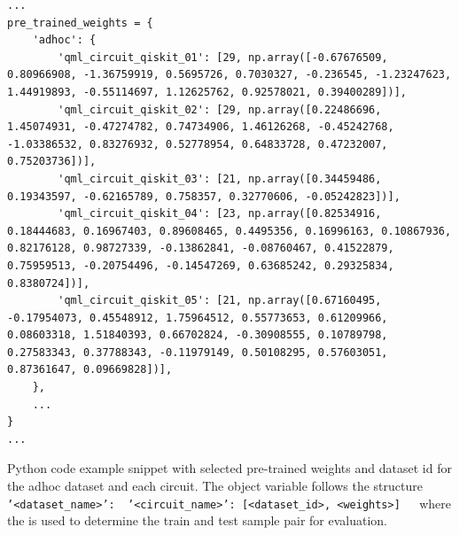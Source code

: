 \begin{listing}[!ht]
    \begin{verbatim}
...
pre_trained_weights = {
    'adhoc': {
        'qml_circuit_qiskit_01': [29, np.array([-0.67676509, 0.80966908, -1.36759919, 0.5695726, 0.7030327, -0.236545, -1.23247623, 1.44919893, -0.55114697, 1.12625762, 0.92578021, 0.39400289])],
        'qml_circuit_qiskit_02': [29, np.array([0.22486696, 1.45074931, -0.47274782, 0.74734906, 1.46126268, -0.45242768, -1.03386532, 0.83276932, 0.52778954, 0.64833728, 0.47232007, 0.75203736])],
        'qml_circuit_qiskit_03': [21, np.array([0.34459486, 0.19343597, -0.62165789, 0.758357, 0.32770606, -0.05242823])],
        'qml_circuit_qiskit_04': [23, np.array([0.82534916, 0.18444683, 0.16967403, 0.89608465, 0.4495356, 0.16996163, 0.10867936, 0.82176128, 0.98727339, -0.13862841, -0.08760467, 0.41522879, 0.75959513, -0.20754496, -0.14547269, 0.63685242, 0.29325834, 0.8380724])],
        'qml_circuit_qiskit_05': [21, np.array([0.67160495, -0.17954073, 0.45548912, 1.75964512, 0.55773653, 0.61209966, 0.08603318, 1.51840393, 0.66702824, -0.30908555, 0.10789798, 0.27583343, 0.37788343, -0.11979149, 0.50108295, 0.57603051, 0.87361647, 0.09669828])], 
    },
    ...
}
...
    \end{verbatim}
    \caption{Python code example snippet with selected pre-trained weights and dataset id for the adhoc dataset and each circuit. The object variable  follows the structure \texttt{{ '<dataset_name>': { '<circuit_name>': [<dataset_id>, <weights>] } }}\ where the  is used to determine the train and test sample pair for evaluation.}
    \label{listing:pre-trained_weights_evaluation_run_adhoc}
\end{listing}

